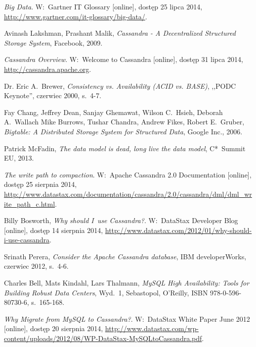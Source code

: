 
\begin{thebibliography}{9}

\emph{Big Data}. W:~Gartner IT Glossary [online], dostęp 25 lipca 2014, \linebreak \url{http://www.gartner.com/it-glossary/big-data/}.

Avinash Lakshman, Prashant Malik, \emph{Cassandra - A Decentralized Structured Storage System}, Facebook, 2009.

\emph{Cassandra Overview}. W:~Welcome to Cassandra [online], dostęp 31 lipca 2014, \url{http://cassandra.apache.org}.

Dr. Eric A.~Brewer, \emph{Consistency vs. Availability (ACID vs. BASE)}, ,,PODC Keynote'', czerwiec 2000, s.~4-7.

Fay Chang, Jeffrey Dean, Sanjay Ghemawat, Wilson C.~Hsieh, Deborah A.~Wallach Mike Burrows, Tushar Chandra, Andrew Fikes, Robert E.~Gruber, \emph{Bigtable: A Distributed Storage System for Structured Data}, Google Inc., 2006.

Patrick McFadin, \emph{The data model is dead, long live the data model}, C*~Summit EU, 2013.

\emph{The write path to compaction}. W:~Apache Cassandra 2.0 Documentation [online], dostęp 25 sierpnia 2014, \url{http://www.datastax.com/documentation/cassandra/2.0/cassandra/dml/dml\_write\_path\_c.html}.

Billy Bosworth, \emph{Why should I~use Cassandra?}. W:~DataStax Developer Blog [online], dostęp 14 sierpnia 2014, \url{http://www.datastax.com/2012/01/why-should-i-use-cassandra}.

Srinath Perera, \emph{Consider the Apache Cassandra database}, IBM developerWorks, czerwiec 2012, s.~4-6.

Charles Bell, Mats Kindahl, Lars Thalmann, \emph{MySQL High Availability: Tools for Building Robust Data Centers}, Wyd.~1, Sebastopol, O'Reilly, ISBN 978-0-596-80730-6, s.~165-168.

\emph{Why Migrate from MySQL to Cassandra?}. W:~DataStax White Paper June 2012 [online], dostęp 20 sierpnia 2014, \url{http://www.datastax.com/wp-content/uploads/2012/08/WP-DataStax-MySQLtoCassandra.pdf}.


\end{thebibliography}
